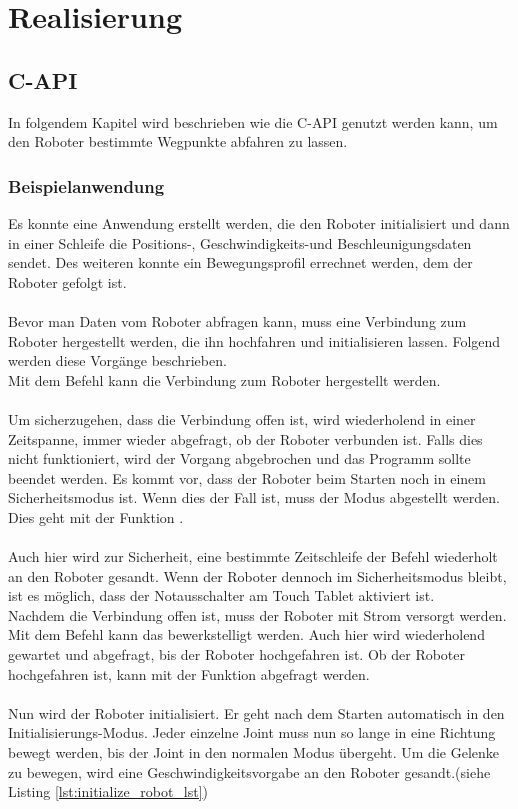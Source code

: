 \chapter{Realisierung}
\label{chap:umsetzung}

\section{C-API}
\label{sec:capi_rel}

In folgendem Kapitel wird beschrieben wie die C-\ac{API} genutzt werden kann, um den Roboter bestimmte Wegpunkte abfahren zu lassen.

\subsection{Beispielanwendung}
\label{sub:capi-problems_rel}

Es konnte eine Anwendung erstellt werden, die den Roboter initialisiert und dann in einer Schleife die Positions-, Geschwindigkeits-und Beschleunigungsdaten sendet. Des weiteren konnte ein Bewegungsprofil errechnet werden, dem der Roboter gefolgt ist.
\\\\
Bevor man Daten vom Roboter abfragen kann, muss eine Verbindung zum Roboter hergestellt werden, die ihn hochfahren und initialisieren lassen. Folgend werden diese Vorgänge beschrieben.\\
Mit dem Befehl  kann die Verbindung zum Roboter hergestellt werden.
\\\\
Um sicherzugehen, dass die Verbindung offen ist, wird wiederholend in einer Zeitspanne, immer wieder abgefragt, ob der Roboter verbunden ist. Falls dies nicht funktioniert, wird der Vorgang abgebrochen und das Programm sollte beendet werden. Es kommt vor, dass der Roboter beim Starten noch in einem Sicherheitsmodus ist. Wenn dies der Fall ist, muss der Modus abgestellt werden. Dies geht mit der Funktion .
\\\\
Auch hier wird zur Sicherheit, eine bestimmte Zeitschleife der Befehl wiederholt an den Roboter gesandt. Wenn der Roboter dennoch im Sicherheitsmodus bleibt, ist es möglich, dass der Notausschalter am Touch Tablet aktiviert ist.
\\
Nachdem die Verbindung offen ist, muss der Roboter mit Strom versorgt werden. Mit dem Befehl  kann das bewerkstelligt werden. Auch hier wird wiederholend gewartet und abgefragt, bis der Roboter hochgefahren ist. Ob der Roboter hochgefahren ist, kann mit der Funktion  abgefragt werden.
\\\\
Nun wird der Roboter initialisiert. Er geht nach dem Starten automatisch in den Initialisierungs-Modus. Jeder einzelne Joint muss nun so lange in eine Richtung bewegt werden, bis der Joint in den normalen Modus übergeht. Um die Gelenke zu bewegen, wird eine Geschwindigkeitsvorgabe an den Roboter gesandt.(siehe Listing \ref{lst:initialize_robot_lst})

